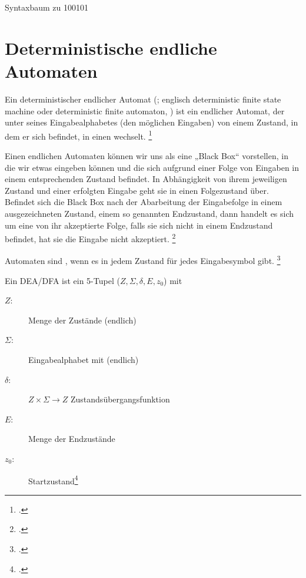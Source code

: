 \documentclass{lehramt-informatik-haupt}
\begin{document}
Syntaxbaum zu 100101
\begin{center}
\end{center}

%

\section{Deterministische endliche Automaten}

Ein deterministischer endlicher Automat (; englisch
deterministic finite state machine oder deterministic finite automaton,
) ist ein endlicher Automat, der unter  seines Eingabealphabetes (den möglichen Eingaben) von einem
Zustand, in dem er sich befindet, in einen  wechselt.
\footcite{wiki:dea}

Einen endlichen Automaten können wir uns als eine „Black Box“
vorstellen, in die wir etwas eingeben können und die sich aufgrund einer
Folge von Eingaben in einem entsprechenden Zustand befindet. In
Abhängigkeit von ihrem jeweiligen Zustand und einer erfolgten Eingabe
geht sie in einen Folgezustand über. Befindet sich die Black Box nach
der Abarbeitung der Eingabefolge in einem ausgezeichneten Zustand, einem
so genannten Endzustand, dann handelt es sich um eine von ihr
akzeptierte Folge, falls sie sich nicht in einem Endzustand befindet,
hat sie die Eingabe nicht akzeptiert.
\footcite[Seite 11]{vossen}

Automaten sind , wenn es in jedem Zustand für jedes
Eingabesymbol  gibt.
\footcite[Seite 28]{vossen}

Ein DEA/DFA ist ein 5-Tupel ($Z, \Sigma, \delta, E, z_0$) mit

\begin{description}
\item[$Z$:] Menge der Zustände (endlich)
\item[$\Sigma$:] Eingabealphabet mit (endlich)
\item[$\delta$:] $Z \times \Sigma \rightarrow Z$ Zustandsübergangsfunktion
\item[$E$:] Menge der Endzustände
\item[$z_0$:] Startzustand\footcite[Seite 26]{theo:fs:1}
\end{description}
\end{document}
